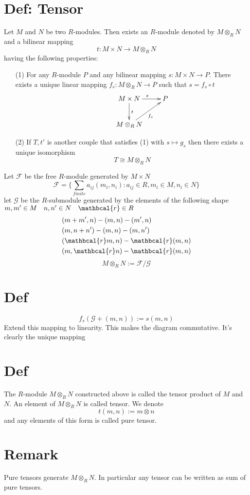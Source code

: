\documentclass{article}
\begin{document}
\section{Def: Tensor}
Let $M$ and $N$ be two $R$-modules. Then exists an $R$-module denoted by $M\otimes _RN$ and a bilinear mapping 
$$t:M\times N\rightarrow M\otimes_RN$$ having the following properties:
\begin{itemize}
    \item[(1)]For any $R$-module $P$ and any bilinear mapping $s:M\times N\rightarrow P$. There exists a unique linear mapping $f_s:M\otimes_RN\rightarrow P$ such that $s=f_s\circ t$
    $$\xymatrix{
        & M\times N \ar[d]^t \ar[r]^s & P \\
        & M\otimes_RN\ar[ur]_{f_s}&
    } $$
    \item[(2)] If $T,t'$ is another couple that satisfies (1) with $s\mapsto g_s$ then there exists a unique isomorphism $$T\cong M\otimes_RN$$
\end{itemize}

Let $\mathcal{F}$ be the free $R$-module generated by $M\times N$
    $$\mathcal{F}=\{\sum\limits_{finite}a_{ij}(m_i,n_i):a_{ij}\in R,m_i\in M,n_i\in N\}$$
    let $\mathcal{G}$ be the $R$-submodule generated by the elements of the following shape $m,m'\in M\quad n,n'\in N\quad \mathbcal{r}\in R$
    $$\begin{aligned}
        &(m+m',n)-(m,n)-(m',n)\\
        &(m,n+n')-(m,n)-(m,n')\\
        &(\mathbcal{r}m,n)-\mathbcal{r}(m,n)\\
        &(m,\mathbcal{r}n)-\mathbcal{r}(m,n)
    \end{aligned}$$
    $$M\otimes_RN:=\mathcal{F}/\mathcal{G}$$
\section{Def}
$$f_s(\mathcal{G}+(m,n)):=s(m,n)$$
Extend this mapping to linearity. This makes the diagram commutative. It's clearly the unique mapping
\section{Def}
The $R$-module $M\otimes_RN$ constructed above is called the tensor product of $M$ and $N$. An element of $M\otimes_RN$ is called tensor. We denote$$t(m,n):=m\otimes n$$ and any elements of this form is called pure tensor. 
\section{Remark}Pure tensors generate $M\otimes_R N$. In particular any tensor can be written as sum of pure tensors.
\end{document}
